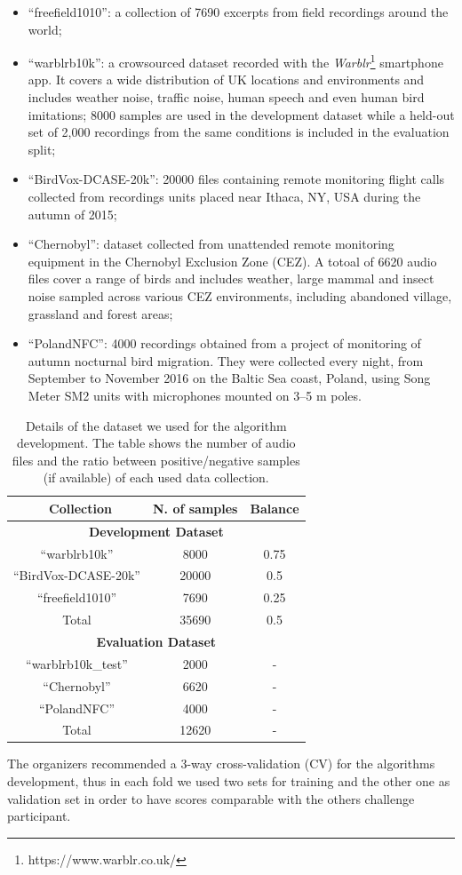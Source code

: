 \begin{itemize}
	\item ``freefield1010'': a collection of 7690 excerpts from field recordings around the world;
	\item ``warblrb10k'': a crowsourced dataset recorded with the \textit{Warblr}\footnote{https://www.warblr.co.uk/} smartphone app. It covers a wide distribution of UK locations and environments and includes weather noise, traffic noise, human speech and even human bird imitations; 8000 samples are used in the development dataset while a held-out set of 2,000 recordings from the same conditions is included in the evaluation split;
	\item ``BirdVox-DCASE-20k'': 20000 files containing remote monitoring flight calls collected from  recordings units placed near Ithaca, NY, USA during the autumn of 2015;
	\item ``Chernobyl'': dataset collected from unattended remote monitoring equipment in the Chernobyl Exclusion Zone (CEZ). A totoal of 6620 audio files cover a range of birds and includes weather, large mammal and insect noise sampled across various CEZ environments, including abandoned village, grassland and forest areas;
	\item ``PolandNFC'': 4000 recordings obtained from a project of monitoring of autumn nocturnal bird migration. They were collected every night, from September to November 2016 on the Baltic Sea coast, Poland, using Song Meter SM2 units with microphones mounted on 3–5 m poles.
\end{itemize}

\begin{table}[t]
	\centering
	\begin{tabular}{|c|c|c|}
		\hline
		\ \textbf{Collection} \rule{0pt}{10pt} & \textbf{N. of samples}  & \textbf{Balance} \\
		\hline
		\hline	
		\multicolumn{3}{|c|}{\textbf{Development Dataset}  \rule{0pt}{10pt}} \\ 
		\hline
		``warblrb10k'' & 8000 & 0.75 \\
		\hline
		``BirdVox-DCASE-20k'' & 20000 & 0.5 \\
		\hline
		``freefield1010'' & 7690 & 0.25 \\
		\hline
		
		Total 	& 35690	& 0.5 \\
		
		\hline
		\hline
		
		\multicolumn{3}{|c|}{\textbf{Evaluation Dataset}  \rule{0pt}{10pt}} \\ 
		\hline
		``warblrb10k\_test'' & 2000 & - \\
		\hline
		``Chernobyl'' & 6620 & - \\
		\hline
		``PolandNFC'' & 4000 & - \\
		\hline
		Total 	& 12620 & - \\
		\hline
	\end{tabular}
	\caption{Details of the dataset we used for the algorithm development. The table shows the number of audio files and the ratio between positive/negative samples (if available) of each used data collection.}
	\label{tab:dataset} 
\end{table}

The organizers recommended a 3-way cross-validation (CV) for the algorithms development, thus in each fold we used two sets for training and the other one as validation set in order to have scores comparable with the others challenge participant.